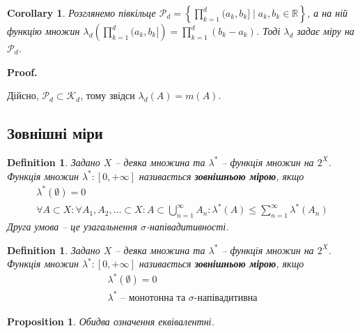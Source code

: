 \documentclass[a4paper, 10pt]{article}
\makeatletter
\theoremstyle{theoremdd}
\newtheorem{definition}[theorem]{Definition}
\newtheorem{proposition}[theorem]{Proposition}
\newtheorem{corollary}[theorem]{Corollary}
\renewenvironment{proof}[1][Proof.\\]{\par
\pushQED{\hfill \qed}%
\normalfont \topsep6\p@\@plus6\p@\relax
\trivlist
\item\relax
{\bfseries
#1\@addpunct{.}}\hspace\labelsep\ignorespaces
}{%
\popQED\endtrivlist\@endpefalse
}
\makeatother
\begin{document}
\begin{corollary}
Розглянемо півкільце $\mathcal{P}_d = \displaystyle \left\{ \prod_{k=1}^d (a_k,b_k] \mid a_k,b_k \in \mathbb{R} \right\}$, а на ній функцію множин $\displaystyle \lambda_d \left( \prod_{k=1}^d (a_k,b_k] \right) = \prod_{k=1}^d (b_k-a_k)$. Тоді $\lambda_d$ задає міру на $\mathcal{P}_d$.
\end{corollary}

\begin{proof}
Дійсно, $\mathcal{P}_d \subset \mathcal{K}_d$, тому звідси $\lambda_d(A) = m(A)$.
\end{proof}

\subsection{Зовнішні міри}
\begin{definition}
Задано $X$ -- деяка множина та $\lambda^*$ -- функція множин на $2^X$.\\
Функція множин $\lambda^* \colon [0,+\infty]$ називається \textbf{зовнішньою мірою}, якщо
\begin{align*}
\lambda^*(\emptyset) = 0 \\
\forall A \subset X: \forall A_1,A_2,\dots \subset X: A \subset \displaystyle\bigcup_{n=1}^\infty A_n: \lambda^*(A) \leq \sum_{n=1}^\infty \lambda^*(A_n)
\end{align*}
Друга умова -- це узагальнення $\sigma$-напівадитивності.
\end{definition}

\begin{definition}
Задано $X$ -- деяка множина та $\lambda^*$ -- функція множин на $2^X$.\\
Функція множин $\lambda^* \colon [0,+\infty]$ називається \textbf{зовнішньою мірою}, якщо
\begin{align*}
\lambda^*(\emptyset) = 0 \\
\lambda^* \text{ -- монотонна та $\sigma$-напівадитивна}
\end{align*}
\end{definition}

\begin{proposition}
Обидва означення еквівалентні.
\end{proposition}
\end{document}
